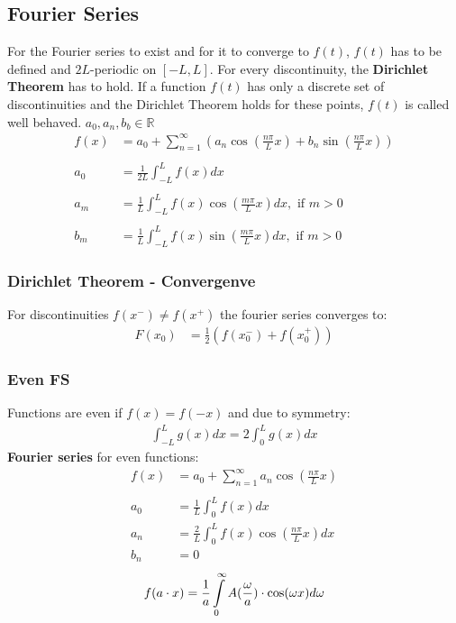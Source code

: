 \subsection{Fourier Series}
For the Fourier series to exist and for it to converge to $f(t)$, $f(t)$ has to be defined and $2L$-periodic on $[-L,L]$.
For every discontinuity, the \textbf{Dirichlet Theorem} has to hold. If a function $f(t)$ has only a discrete set of discontinuities and the Dirichlet Theorem holds for these points, $f(t)$ is called well behaved. $a_0,a_n,b_b\in \mathbb{R}$
\begin{align*}
    f(x)  & =a_0+\sum_{n=1}^\infty\left(a_n\cos\left(\frac{n\pi}Lx\right)+b_n\sin\left(\frac{n\pi}Lx\right)\right) \\ \\
    a_{0} & =\frac{1}{2L}\int_{-L}^{L}f(x)dx                                                                       \\ \\
    a_{m} & =\frac{1}{L}\int_{-L}^{L}f(x)\cos\left(\frac{m\pi}{L}x\right)dx,\text{ if }m>0                         \\ \\
    b_{m} & =\frac{1}{L}\int_{-L}^{L}f(x)\sin\left(\frac{m\pi}{L}x\right)dx,\text{ if }m>0
\end{align*}
\subsubsection{Dirichlet Theorem - Convergenve}
For discontinuities $f(x^-)\neq f(x^+)$ the fourier series converges to:
\begin{align*}
    F(x_0) & =\frac12(f(x_0^-)+f(x_0^+))
\end{align*}

\subsubsection{Even FS}
Functions are even if $f(x)=f(-x)$ and due to symmetry:
\begin{align*}
    \int_{-L}^{L}g(x)dx=2\int_0^{L}g(x)dx
\end{align*}
\textbf{Fourier series} for even functions:
\begin{align*}
    f(x)  & =a_0+\sum_{n=1}^{\infty}a_n\cos\left(\frac{n\pi}{L}x\right) \\ \\
    a_{0} & =\frac{1}{L}\int_{0}^{L}f(x)dx                              \\
    a_{n} & =\frac2L\int_0^{L}f(x)\cos\left(\frac{n\pi}Lx\right)dx      \\
    b_{n} & =0
\end{align*}
\begin{align*}
    f(a\cdot x)=\frac1a\intop_0^\infty A(\frac\omega a)\cdot \cos(\omega x)d\omega
\end{align*}
